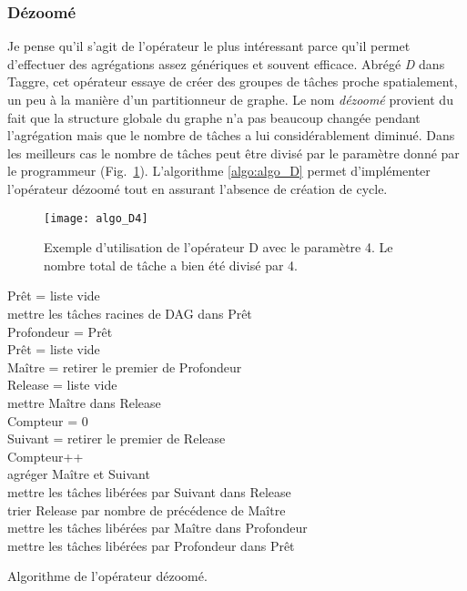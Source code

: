 \subsubsection{Dézoomé}
Je pense qu'il s'agit de l'opérateur le plus intéressant parce qu'il permet d'effectuer des agrégations assez génériques et souvent efficace.
%
Abrégé {\em D} dans Taggre, cet opérateur essaye de créer des groupes de tâches proche spatialement, un peu à la manière d'un partitionneur de graphe.
%
Le nom {\em dézoomé} provient du fait que la structure globale du graphe n'a pas beaucoup changée pendant l'agrégation mais que le nombre de tâches a lui considérablement diminué.
%
Dans les meilleurs cas le nombre de tâches peut être divisé par le paramètre donné par le programmeur (Fig.~\ref{fig:algo_D4}).
%
L'algorithme \ref{algo:algo_D} permet d'implémenter l'opérateur dézoomé tout en assurant l'absence de création de cycle.
\begin{figure}[t!]
  \centering
  \texttt{[image: algo\_D4]}
  \caption{Exemple d'utilisation de l'opérateur D avec le paramètre 4. Le nombre total de tâche a bien été divisé par 4.}
  \label{fig:algo_D4}
\end{figure}

\begin{algorithm}
  {\sc Prêt} = liste vide \\
  mettre les tâches racines de DAG dans {\sc Prêt} \\
   {
    {\sc Profondeur} = {\sc Prêt} \\
    {\sc Prêt} = liste vide \\
     {
      {\sc Maître} = retirer le premier de {\sc Profondeur} \\
      {\sc Release} = liste vide \\
      mettre {\sc Maître} dans {\sc Release} \\
      {\sc Compteur} = 0 \\
       {
        {\sc Suivant} = retirer le premier de {\sc Release} \\
        {\sc Compteur}++\\
        agréger {\sc Maître} et {\sc Suivant}\\
        mettre les tâches libérées par {\sc Suivant} dans {\sc Release} \\
        trier {\sc Release} par nombre de précédence de {\sc Maître} \\
      }
      mettre les tâches libérées par {\sc Maître} dans {\sc Profondeur} \\
    }
    mettre les tâches libérées par {\sc Profondeur} dans {\sc Prêt}\\
  }
  \caption{Algorithme de l'opérateur dézoomé.}
  \label{algo:algo_D}
\end{algorithm}
